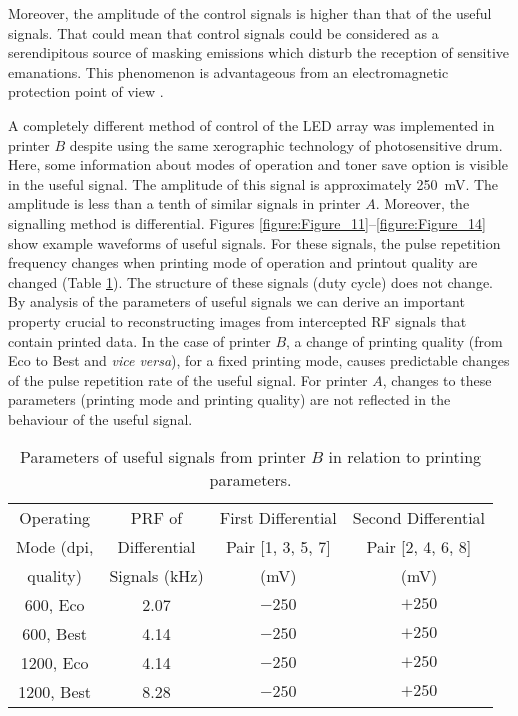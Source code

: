 \documentclass[letterpaper,journal]{ieeetran}
\begin{document}
Moreover, the amplitude of the control signals is higher than that of the
useful signals. That could mean that control signals could be considered as a
serendipitous source of masking emissions which disturb the reception of
sensitive emanations. This phenomenon is advantageous from an electromagnetic
protection point of view \cite{Ulas2016a,Guerrieri2018a,Loughry2002a}.

A completely different method of control of the LED array was implemented in
printer $B$ despite using the same xerographic technology of photosensitive
drum. Here, some information about modes of operation and toner save option is
visible in the useful signal. The amplitude of this signal is approximately
\SI{250}{\milli\volt}. The amplitude is less than a tenth of similar signals
in printer $A$. Moreover, the signalling method is differential.
Figures \ref{figure:Figure_11}--\ref{figure:Figure_14} show example waveforms
of useful signals. For these signals, the pulse repetition frequency changes
when printing mode of operation and printout quality are changed (Table
\ref{table:Table_2}). The structure of these signals (duty cycle) does not
change. By analysis of the parameters of useful signals we can derive an
important property crucial to reconstructing images from intercepted RF
signals that contain printed data. In the case of printer $B$, a change of
printing quality (from Eco to Best and {\it vice versa}), for a fixed
printing mode, causes predictable changes of the pulse repetition rate of the
useful signal. For printer $A$, changes to these parameters (printing mode
and printing quality) are not reflected in the behaviour of the useful
signal.

\begin{table}[H]
    \caption{Parameters of useful signals from printer $B$ in relation to
        printing parameters.}
    \label{table:Table_2}
    \centering
    \begin{tabular}{|c|c|c|c|}
        \hline
        Operating  & PRF of       & First Differential & Second Differential \\
        Mode (dpi, & Differential & Pair [1, 3, 5, 7]  & Pair [2, 4, 6, 8] \\
        quality)   & Signals (\si{\kilo\hertz}) & (\si{\milli\volt}) &
                                                  (\si{\milli\volt}) \\
        \hline
        600, Eco   & 2.07 & $-250$ & $+250$ \\
        600, Best  & 4.14 & $-250$ & $+250$ \\
        1200, Eco  & 4.14 & $-250$ & $+250$ \\
        1200, Best & 8.28 & $-250$ & $+250$ \\
        \hline
    \end{tabular}
\end{table}
\end{document}
